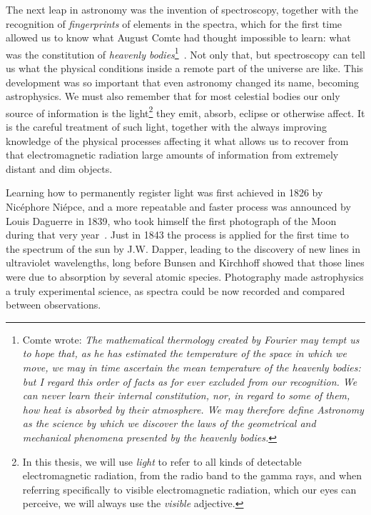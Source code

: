 	 The next leap in astronomy was the invention of spectroscopy,
	together with the recognition of \emph{fingerprints} of elements
	in the spectra, which for the first time allowed us to know what
	August Comte had thought impossible to learn: what was the
	constitution of \emph{heavenly bodies}\footnote{Comte wrote:
	\emph{The mathematical thermology created by Fourier may tempt
	us to hope that, as he has estimated the temperature of the
	space in which we move, we may in time ascertain the mean
	temperature of the heavenly bodies: but I regard this order of
	facts as for ever excluded from our recognition. We can never
	learn their internal constitution, nor, in regard to some of
	them, how heat is absorbed by their atmosphere. We may therefore
	define Astronomy as the science by which we discover the laws of
	the geometrical and mechanical phenomena presented by the
	heavenly bodies.}}~\cite{1896psac.book..149C}. Not only that,
	but spectroscopy can tell us what the physical conditions inside
	a remote part of the universe are like. This development was so
	important that even astronomy changed its name, becoming
	astrophysics. We must also remember that for most celestial
	bodies our only source of information is the light\footnote{In
	this thesis, we will use \emph{light} to refer to all kinds of
	detectable electromagnetic radiation, from the radio band to the
	gamma rays, and when referring specifically to visible
	electromagnetic radiation, which our eyes can perceive, we will
	always use the \emph{visible} adjective.} they emit, absorb,
	eclipse or otherwise affect. It is the careful treatment of such
	light, together with the always improving knowledge of the
	physical processes affecting it what allows us to recover from
	that electromagnetic radiation large amounts of information from
	extremely distant and dim objects.
	
	 Learning how to permanently register light was first achieved
	in 1826 by Nicéphore Niépce, and a more repeatable and faster
	process was announced by Louis Daguerre in 1839, who took
	himself the first photograph of the Moon during that very
	year~\cite{1961apdt.book.....D, Abrahams:kc}. Just in 1843 the
	process is applied for the first time to the spectrum of the sun
	by J.W. Dapper, leading to the discovery of new lines in
	ultraviolet wavelengths, long before Bunsen and Kirchhoff showed
	that those lines were due to absorption by several atomic
	species. Photography made astrophysics a truly experimental
	science, as spectra could be now recorded and compared between
	observations.
	
